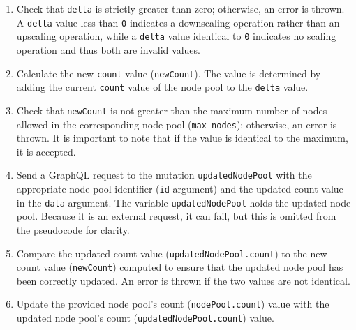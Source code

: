 \begin{enumerate}[label=\protect\circled{\arabic{*}}]
  \item Check that \texttt{delta} is strictly greater than zero; otherwise, an
    error is thrown.
    \newline
    A \texttt{delta} value less than \texttt{0} indicates a downscaling operation
    rather than an upscaling operation, while a \texttt{delta} value identical to
    \texttt{0} indicates no scaling operation and thus both are invalid values.

  \item Calculate the new \texttt{count} value (\texttt{newCount}).
    \newline
    The value is determined by adding the current \texttt{count} value of the node
    pool to the \texttt{delta} value.

  \item Check that \texttt{newCount} is not greater than the maximum number of
    nodes allowed in the corresponding node pool (\texttt{max\_nodes});
    otherwise, an error is thrown.
    \newline
    It is important to note that if the value is identical to the maximum, it is
    accepted.

  \item Send a GraphQL request to the mutation \texttt{updatedNodePool} with the
    appropriate node pool identifier (\texttt{id} argument) and the updated count
    value in the \texttt{data} argument. The variable \texttt{updatedNodePool}
    holds the updated node pool.
    \newline
    Because it is an external request, it can fail, but this is omitted from the
    pseudocode for clarity.

  \item Compare the updated count value (\texttt{updatedNodePool.count}) to the
    new count value (\texttt{newCount}) computed to ensure that the updated node
    pool has been correctly updated. An error is thrown if the two values are
    not identical.

  \item Update the provided node pool's count (\texttt{nodePool.count}) value
    with the updated node pool's count (\texttt{updatedNodePool.count}) value.
\end{enumerate}

